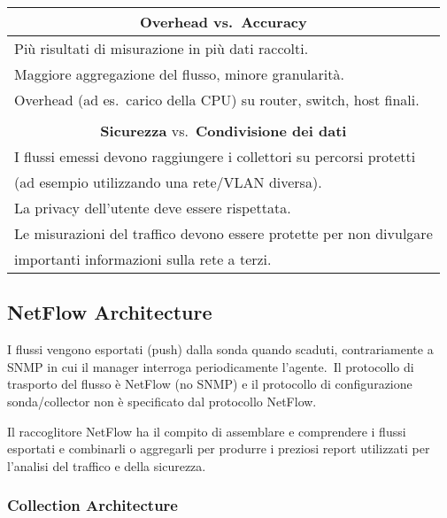 \begin{table}[H]
    \centering
    \begin{tabular}{|l|}
        \hline
        \multicolumn{1}{|c|}{\textbf{Overhead} vs.\ \textbf{Accuracy}}               \\\hline\hline
        Più risultati di misurazione in più dati raccolti.                           \\
        Maggiore aggregazione del flusso, minore granularità.                        \\
        Overhead (ad es.\ carico della CPU) su router, switch, host finali.          \\\hline
        \multicolumn{1}{c}{}                                                         \\\hline
        \multicolumn{1}{|c|}{\textbf{Sicurezza} vs.\ \textbf{Condivisione dei dati}} \\\hline\hline
        I flussi emessi devono raggiungere i collettori su percorsi protetti         \\
        \quad(ad esempio utilizzando una rete/VLAN diversa).                         \\
        La privacy dell'utente deve essere rispettata.                               \\
        Le misurazioni del traffico devono essere protette per non divulgare         \\
        \quad importanti informazioni sulla rete a terzi.                            \\\hline
    \end{tabular}
\end{table}

\subsection{NetFlow Architecture}

I flussi vengono esportati (push) dalla sonda quando scaduti, contrariamente a SNMP in cui il manager interroga periodicamente l'agente.\
Il protocollo di trasporto del flusso è NetFlow (no SNMP) e il protocollo di configurazione sonda/collector non è specificato dal protocollo NetFlow.\

Il raccoglitore NetFlow ha il compito di assemblare e comprendere i flussi esportati e combinarli o aggregarli per produrre i preziosi report utilizzati per l'analisi del traffico e della sicurezza.\

\subsubsection{Collection Architecture}

